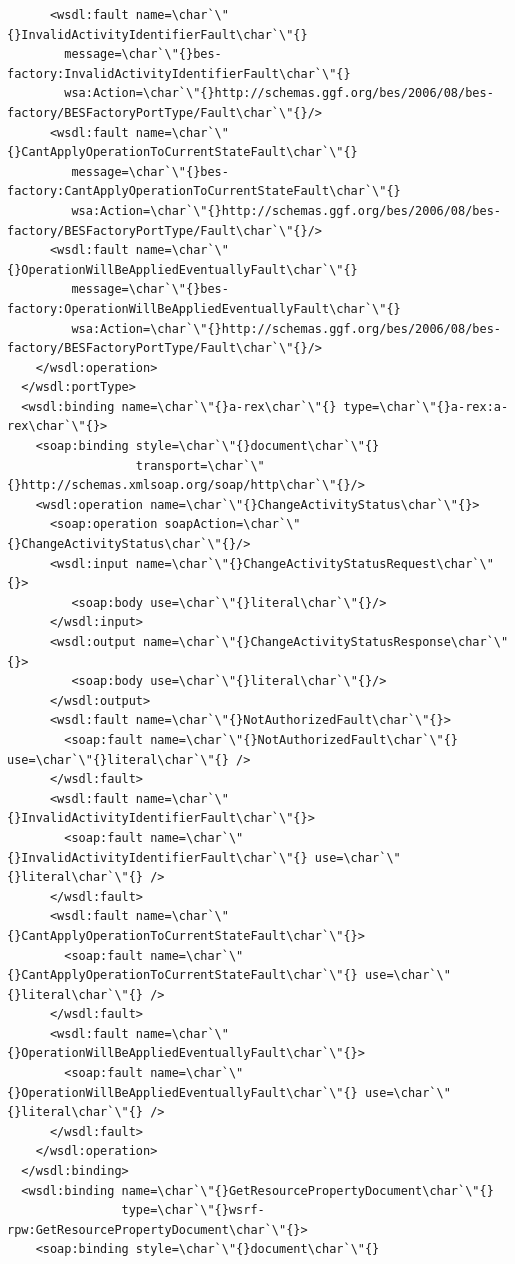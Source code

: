 \documentclass{article}                            %
\begin{document}
\begin{footnotesize}
\begin{verbatim}
      <wsdl:fault name=\char`\"{}InvalidActivityIdentifierFault\char`\"{}
        message=\char`\"{}bes-factory:InvalidActivityIdentifierFault\char`\"{}
        wsa:Action=\char`\"{}http://schemas.ggf.org/bes/2006/08/bes-factory/BESFactoryPortType/Fault\char`\"{}/>
      <wsdl:fault name=\char`\"{}CantApplyOperationToCurrentStateFault\char`\"{}
         message=\char`\"{}bes-factory:CantApplyOperationToCurrentStateFault\char`\"{}
         wsa:Action=\char`\"{}http://schemas.ggf.org/bes/2006/08/bes-factory/BESFactoryPortType/Fault\char`\"{}/>
      <wsdl:fault name=\char`\"{}OperationWillBeAppliedEventuallyFault\char`\"{}
         message=\char`\"{}bes-factory:OperationWillBeAppliedEventuallyFault\char`\"{}
         wsa:Action=\char`\"{}http://schemas.ggf.org/bes/2006/08/bes-factory/BESFactoryPortType/Fault\char`\"{}/>
    </wsdl:operation>
  </wsdl:portType>
  <wsdl:binding name=\char`\"{}a-rex\char`\"{} type=\char`\"{}a-rex:a-rex\char`\"{}>
    <soap:binding style=\char`\"{}document\char`\"{}
                  transport=\char`\"{}http://schemas.xmlsoap.org/soap/http\char`\"{}/>
    <wsdl:operation name=\char`\"{}ChangeActivityStatus\char`\"{}>
      <soap:operation soapAction=\char`\"{}ChangeActivityStatus\char`\"{}/>
      <wsdl:input name=\char`\"{}ChangeActivityStatusRequest\char`\"{}>
         <soap:body use=\char`\"{}literal\char`\"{}/>
      </wsdl:input>
      <wsdl:output name=\char`\"{}ChangeActivityStatusResponse\char`\"{}>
         <soap:body use=\char`\"{}literal\char`\"{}/>
      </wsdl:output>
      <wsdl:fault name=\char`\"{}NotAuthorizedFault\char`\"{}>
        <soap:fault name=\char`\"{}NotAuthorizedFault\char`\"{} use=\char`\"{}literal\char`\"{} />
      </wsdl:fault>
      <wsdl:fault name=\char`\"{}InvalidActivityIdentifierFault\char`\"{}>
        <soap:fault name=\char`\"{}InvalidActivityIdentifierFault\char`\"{} use=\char`\"{}literal\char`\"{} />
      </wsdl:fault>
      <wsdl:fault name=\char`\"{}CantApplyOperationToCurrentStateFault\char`\"{}>
        <soap:fault name=\char`\"{}CantApplyOperationToCurrentStateFault\char`\"{} use=\char`\"{}literal\char`\"{} />
      </wsdl:fault>
      <wsdl:fault name=\char`\"{}OperationWillBeAppliedEventuallyFault\char`\"{}>
        <soap:fault name=\char`\"{}OperationWillBeAppliedEventuallyFault\char`\"{} use=\char`\"{}literal\char`\"{} />
      </wsdl:fault>
    </wsdl:operation>
  </wsdl:binding>
  <wsdl:binding name=\char`\"{}GetResourcePropertyDocument\char`\"{}
                type=\char`\"{}wsrf-rpw:GetResourcePropertyDocument\char`\"{}>
    <soap:binding style=\char`\"{}document\char`\"{}

\end{verbatim}
\end{footnotesize}
\end{document}
